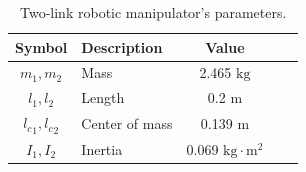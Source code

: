 \documentclass[letterpaper, journal]{IEEEtran}
\begin{document}
\begin{table}[t]
    \renewcommand{\arraystretch}{1.3}
    \caption{Two-link robotic manipulator's parameters.}
    \centering
    \begin{tabular}{c m{9.5em} c c c }
    \hline
    \textbf{Symbol} & \textbf{Description} & \textbf{Value} \\
    \hline
    \hline 
    $m_1,m_2$ & Mass & 2.465 $\mathrm{kg}$ \\
    \hline
    $l_1,l_2$  & Length & 0.2 $\mathrm{m}$ \\  
    \hline
    ${l_c}_1,{l_c}_2$ & Center of mass & 0.139 $\mathrm{m}$ \\
    \hline
    $I_1,I_2$  & Inertia & 0.069 $\mathrm{kg\cdot m^{2}}$ \\
    \hline
    \end{tabular}
    \label{table:system:params}
\end{table}
\end{document}
